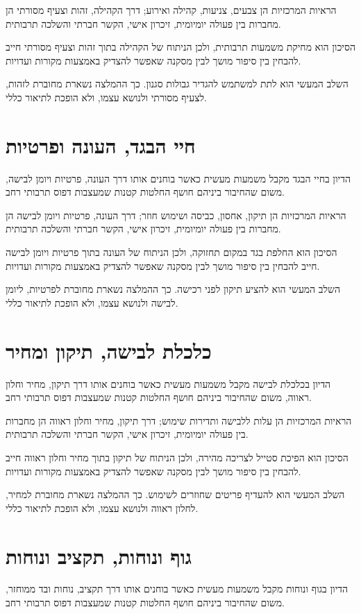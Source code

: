 הראיות המרכזיות הן צבעים, צניעות, קהילה ואירוע; דרך הקהילה, זהות וצעיף מסורתי הן מחברות בין פעולה יומיומית, זיכרון אישי, הקשר חברתי והשלכה תרבותית.

הסיכון הוא מחיקת משמעות תרבותית, ולכן הניתוח של הקהילה בתוך זהות וצעיף מסורתי חייב להבחין בין סיפור מושך לבין מסקנה שאפשר להצדיק באמצעות מקורות ועדויות.

השלב המעשי הוא לתת למשתמש להגדיר גבולות סגנון. כך ההמלצה נשארת מחוברת לזהות, לצעיף מסורתי ולנושא עצמו, ולא הופכת לתיאור כללי.

\section{חיי הבגד, העונה ופרטיות}
הדיון בחיי הבגד מקבל משמעות מעשית כאשר בוחנים אותו דרך העונה, פרטיות ויומן לבישה, משום שהחיבור ביניהם חושף החלטות קטנות שמעצבות דפוס תרבותי רחב.

הראיות המרכזיות הן תיקון, אחסון, כביסה ושימוש חוזר; דרך העונה, פרטיות ויומן לבישה הן מחברות בין פעולה יומיומית, זיכרון אישי, הקשר חברתי והשלכה תרבותית.

הסיכון הוא החלפת בגד במקום תחזוקה, ולכן הניתוח של העונה בתוך פרטיות ויומן לבישה חייב להבחין בין סיפור מושך לבין מסקנה שאפשר להצדיק באמצעות מקורות ועדויות.

השלב המעשי הוא להציע תיקון לפני רכישה. כך ההמלצה נשארת מחוברת לפרטיות, ליומן לבישה ולנושא עצמו, ולא הופכת לתיאור כללי.

\section{כלכלת לבישה, תיקון ומחיר}
הדיון בכלכלת לבישה מקבל משמעות מעשית כאשר בוחנים אותו דרך תיקון, מחיר וחלון ראווה, משום שהחיבור ביניהם חושף החלטות קטנות שמעצבות דפוס תרבותי רחב.

הראיות המרכזיות הן עלות ללבישה ותדירות שימוש; דרך תיקון, מחיר וחלון ראווה הן מחברות בין פעולה יומיומית, זיכרון אישי, הקשר חברתי והשלכה תרבותית.

הסיכון הוא הפיכת סטייל לצריכה מהירה, ולכן הניתוח של תיקון בתוך מחיר וחלון ראווה חייב להבחין בין סיפור מושך לבין מסקנה שאפשר להצדיק באמצעות מקורות ועדויות.

השלב המעשי הוא להעדיף פריטים שחוזרים לשימוש. כך ההמלצה נשארת מחוברת למחיר, לחלון ראווה ולנושא עצמו, ולא הופכת לתיאור כללי.

\section{גוף ונוחות, תקציב ונוחות}
הדיון בגוף ונוחות מקבל משמעות מעשית כאשר בוחנים אותו דרך תקציב, נוחות ובד ממוחזר, משום שהחיבור ביניהם חושף החלטות קטנות שמעצבות דפוס תרבותי רחב.

